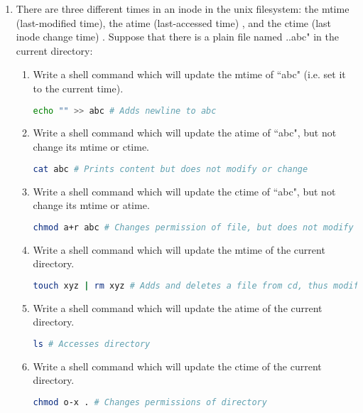 \documentclass[11pt]{article}
\begin{document}
\begin{enumerate}
		\item There are three different times in an inode in the unix filesystem: the mtime (last-modified time), the atime (last-accessed time) , and the ctime (last inode change time) . Suppose that there is a plain file named ..abc" in the current directory:
			\begin{enumerate}
				\item Write a shell command which will update the mtime of ``abc" (i.e. set it to the current time).
					\begin{lstlisting}[language=sh]
echo "" >> abc # Adds newline to abc\end{lstlisting}
				\item Write a shell command which will update the atime of ``abc", but not change its mtime or ctime.
					\begin{lstlisting}[language=sh]
cat abc # Prints content but does not modify or change\end{lstlisting}
				\item Write a shell command which will update the ctime of ``abc", but not change its mtime or atime.
					\begin{lstlisting}[language=sh]
chmod a+r abc # Changes permission of file, but does not modify or access\end{lstlisting}
				\item Write a shell command which will update the mtime of the current directory.
					\begin{lstlisting}[language=sh]
touch xyz | rm xyz # Adds and deletes a file from cd, thus modifying it\end{lstlisting}
				\item Write a shell command which will update the atime of the current directory.
					\begin{lstlisting}[language=sh]
ls # Accesses directory\end{lstlisting}
				\item Write a shell command which will update the ctime of the current directory.
					\begin{lstlisting}[language=sh]
chmod o-x . # Changes permissions of directory\end{lstlisting}
			\end{enumerate}


\end{enumerate}
\end{document}
